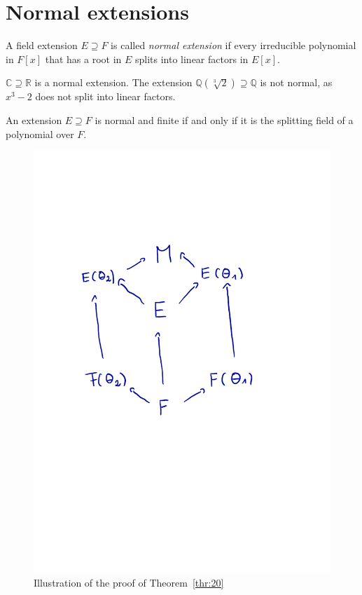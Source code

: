 \section{Normal extensions}
\label{sec:normal-extensions}



\begin{definition}
  \label{def:3}
  A field extension $E ⊇F$ is called \emph{normal extension} if every irreducible polynomial in $F[x]$ that has a root in $E$ splits into linear factors in $E[x]$.
\end{definition}


\begin{example}
  \label{exe:7}
  $ℂ⊇ℝ$ is a normal extension. The extension $ℚ(\sqrt[3]{2}) ⊇ ℚ$ is not normal, as $x^3 - 2$ does not split into linear factors.  
\end{example}


\begin{theorem}
  \label{thr:20}
  An extension $E ⊇ F$ is normal and finite if and only if it is the splitting field of a polynomial over $F$. 
\end{theorem}

\begin{figure}
  \centering
\includegraphics{normal.pdf}  
  \caption{Illustration of the proof of Theorem~\ref{thr:20}}
  \label{fig:1}
\end{figure}




